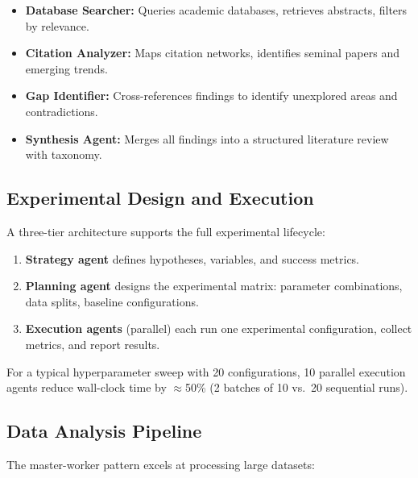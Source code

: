 \documentclass[11pt,letterpaper,twocolumn]{article}
\begin{document}
\begin{itemize}[leftmargin=*,itemsep=1pt]
  \item \textbf{Database Searcher:} Queries academic databases, retrieves
    abstracts, filters by relevance.
  \item \textbf{Citation Analyzer:} Maps citation networks, identifies
    seminal papers and emerging trends.
  \item \textbf{Gap Identifier:} Cross-references findings to identify
    unexplored areas and contradictions.
  \item \textbf{Synthesis Agent:} Merges all findings into a structured
    literature review with taxonomy.
\end{itemize}

\subsection{Experimental Design and Execution}

A three-tier architecture supports the full experimental lifecycle:

\begin{enumerate}[leftmargin=*,itemsep=2pt]
  \item \textbf{Strategy agent} defines hypotheses, variables, and success
    metrics.
  \item \textbf{Planning agent} designs the experimental matrix:
    parameter combinations, data splits, baseline configurations.
  \item \textbf{Execution agents} (parallel) each run one experimental
    configuration, collect metrics, and report results.
\end{enumerate}

For a typical hyperparameter sweep with 20 configurations, 10 parallel
execution agents reduce wall-clock time by $\approx$50\% (2 batches of 10
vs.\ 20 sequential runs).

\subsection{Data Analysis Pipeline}

The master-worker pattern excels at processing large datasets:
\end{document}
